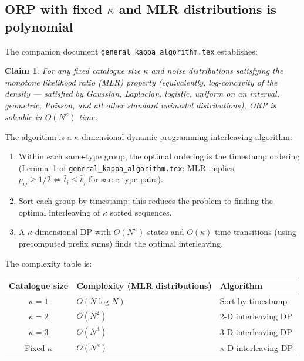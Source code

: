 \documentclass[11pt]{article}
\newtheorem*{claim}{Claim}
\begin{document}
\subsection{ORP with fixed $\kappa$ and MLR distributions is polynomial}

The companion document \texttt{general\_kappa\_algorithm.tex} establishes:

\begin{claim}
For any fixed catalogue size $\kappa$ and noise distributions satisfying the
monotone likelihood ratio (MLR) property (equivalently, log-concavity of the density
--- satisfied by Gaussian, Laplacian, logistic, uniform on an interval, geometric,
Poisson, and all other standard unimodal distributions), ORP is solvable in
$O(N^\kappa)$ time.
\end{claim}

The algorithm is a $\kappa$-dimensional dynamic programming interleaving algorithm:
\begin{enumerate}
\item Within each same-type group, the optimal ordering is the timestamp ordering
  (Lemma~1 of \texttt{general\_kappa\_algorithm.tex}: MLR implies $p_{ij} \ge 1/2
  \iff \hat{t}_i \le \hat{t}_j$ for same-type pairs).
\item Sort each group by timestamp; this reduces the problem to finding the optimal
  interleaving of $\kappa$ sorted sequences.
\item A $\kappa$-dimensional DP with $O(N^\kappa)$ states and $O(\kappa)$-time
  transitions (using precomputed prefix sums) finds the optimal interleaving.
\end{enumerate}

\noindent The complexity table is:

\medskip
\begin{center}
\renewcommand{\arraystretch}{1.3}
\begin{tabular}{@{}cll@{}}
\hline
\textbf{Catalogue size} & \textbf{Complexity (MLR distributions)} & \textbf{Algorithm} \\
\hline
$\kappa = 1$ & $O(N \log N)$ & Sort by timestamp \\
$\kappa = 2$ & $O(N^2)$ & 2-D interleaving DP \\
$\kappa = 3$ & $O(N^3)$ & 3-D interleaving DP \\
Fixed $\kappa$ & $O(N^\kappa)$ & $\kappa$-D interleaving DP \\
\hline
\end{tabular}
\end{center}
\end{document}
